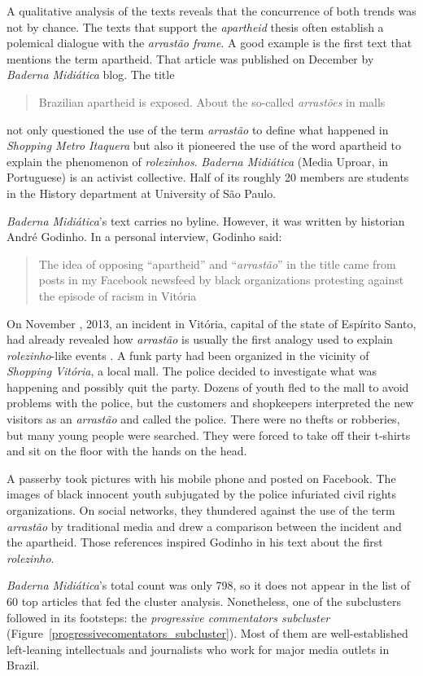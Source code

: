 A qualitative analysis of the texts reveals that the concurrence of both trends was not by chance. The texts that support the \emph{apartheid} thesis often establish a polemical dialogue with the \emph{arrastão frame}. A good example is the first text that mentions the term apartheid. That article was published on December  by \emph{Baderna Midiática} blog. The title \blockcquote{badernamidiatica}{Brazilian apartheid is exposed. About the so-called \emph{arrastões} in malls} not only questioned the use of the term \emph{arrastão} to define what happened in \emph{Shopping Metro Itaquera} but also it pioneered the use of the word apartheid to explain the phenomenon of \emph{rolezinhos}. \emph{Baderna Midiática} (Media Uproar, in Portuguese) is an activist collective. Half of its roughly 20 members are students in the History department at University of São Paulo.

\emph{Baderna Midiática}'s text carries no byline. However, it was written by historian André Godinho. In a personal interview, Godinho said: \blockcquote{interview_godinho}[.]{The idea of opposing \enquote{apartheid} and \enquote{\emph{arrastão}} in the title came from posts in my Facebook newsfeed by black organizations protesting against the episode of racism in Vitória}

On November , 2013, an incident in Vitória, capital of the state of Espírito Santo, had already revealed how \emph{arrastão} is usually the first analogy used to explain \emph{rolezinho}-like events \autocite{vitoria_arrastao}. A funk party had been organized in the vicinity of \emph{Shopping Vitória}, a local mall. The police decided to investigate what was happening and possibly quit the party. Dozens of youth fled to the mall to avoid problems with the police, but the customers and shopkeepers interpreted the new visitors as an \emph{arrastão} and called the police. There were no thefts or robberies, but many young people were searched. They were forced to take off their t-shirts and sit on the floor with the hands on the head.

A passerby took pictures with his mobile phone and posted on Facebook. The images of black innocent youth subjugated by the police infuriated civil rights organizations. On social networks, they thundered against the use of the term \emph{arrastão} by traditional media and drew a comparison between the incident and the apartheid. Those references inspired Godinho in his text about the first \emph{rolezinho}.

\emph{Baderna Midiática}'s total count was only 798, so it does not appear in the list of 60 top articles that fed the cluster analysis. Nonetheless, one of the subclusters followed in its footsteps: the \emph{progressive commentators subcluster} (Figure~\ref{progressivecomentators_subcluster}). Most of them are well-established left-leaning intellectuals and journalists who work for major media outlets in Brazil.

